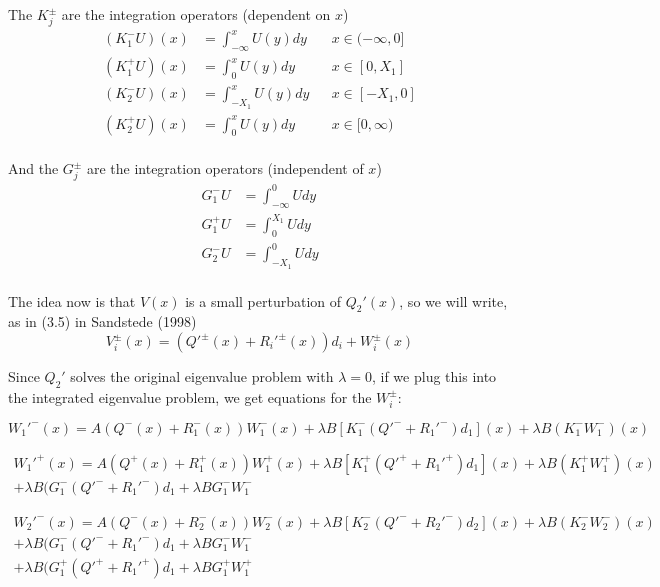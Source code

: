 \documentclass[12pt]{article}
\begin{document}
The $K_j^\pm$ are the integration operators (dependent on $x$)
\begin{align*}
(K_1^- U)(x) &= \int_{-\infty}^x U(y) dy && x \in (-\infty, 0] \\
(K_1^+ U)(x) &= \int_0^x U(y) dy && x \in [0, X_1] \\
(K_2^- U)(x) &= \int_{-X_1}^x U(y) dy && x \in [-X_1, 0] \\
(K_2^+ U)(x) &= \int_0^x U(y) dy && x \in [0, \infty) \\
\end{align*}

And the $G_j^\pm$ are the integration operators (independent of $x$)
\begin{align*}
G_1^- U &= \int_{-\infty}^0 U dy \\
G_1^+ U &= \int_0^{X_1} U dy \\
G_2^- U &= \int_{-X_1}^0 U dy \\
\end{align*}



The idea now is that $V(x)$ is a small perturbation of $Q_2'(x)$, so we will write, as in (3.5) in Sandstede (1998)
\begin{equation}
V_i^\pm(x) = (Q'^\pm(x) + R_i'^\pm(x))d_i + W_i^\pm(x)
\end{equation}

Since $Q_2'$ solves the original eigenvalue problem with $\lambda = 0$, if we plug this into the integrated eigenvalue problem, we get equations for the $W_i^\pm$:

\begin{equation}
W_1'^-(x) = A(Q^-(x) + R_1^-(x))W_1^-(x) + \lambda B [K_1^- (Q'^- + R_1'^-)d_1](x) + \lambda B (K_1^- W_1^-)(x)
\end{equation}

\begin{multline}
W_1'^+(x) = A(Q^+(x) + R_1^+(x))W_1^+(x) + \lambda B [K_1^+ (Q'^+ + R_1'^+)d_1](x) + \lambda B (K_1^+ W_1^+)(x)\\
+ \lambda B ( G_1^-(Q'^- + R_1'^-)d_1 + \lambda B G_1^- W_1^-
\end{multline}

\begin{multline}
W_2'^-(x) = A(Q^-(x) + R_2^-(x))W_2^-(x) + \lambda B [K_2^- (Q'^- + R_2'^-)d_2](x) + \lambda B (K_2^- W_2^-)(x)\\
+ \lambda B ( G_1^-(Q'^- + R_1'^-)d_1 + \lambda B G_1^- W_1^-\\
+ \lambda B ( G_1^+(Q'^+ + R_1'^+)d_1 + \lambda B G_1^+ W_1^+
\end{multline}
\end{document}
